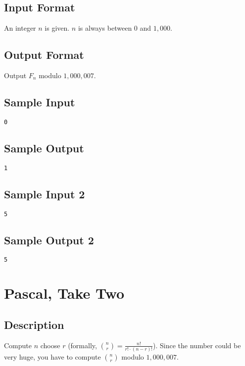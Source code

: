 \subsection*{Input Format}
An integer $n$ is given. $n$ is always between $0$ and $1,000$. 

\subsection*{Output Format}
Output $F_n$ modulo $1,000,007$. 

\subsection*{Sample Input}
\begin{verbatim}
0
\end{verbatim}

\subsection*{Sample Output}
\begin{verbatim}
1
\end{verbatim}

\subsection*{Sample Input 2}
\begin{verbatim}
5
\end{verbatim}

\subsection*{Sample Output 2}
\begin{verbatim}
5
\end{verbatim}

\newpage



\section{Pascal, Take Two}

\subsection*{Description}
Compute $n$ choose $r$ (formally, $\binom{n}{r} = \frac{n!}{r! \cdot (n-r)!}$).  Since the number could be very huge, you have to compute $\binom{n}{r}$ modulo $1,000,007$. 

